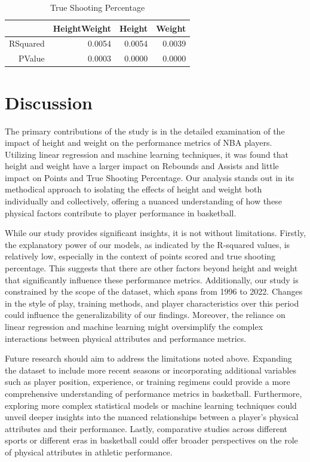 \documentclass[12pt]{article}
\begin{document}
\begin{table}[ht]
\caption{True Shooting Percentage}
\label{tab:ts}
\centering
\begin{tabular}{rrrr}
  \hline
 & HeightWeight & Height & Weight \\ 
  \hline
RSquared & 0.0054 & 0.0054 & 0.0039 \\ 
  PValue & 0.0003 & 0.0000 & 0.0000 \\ 
   \hline
\end{tabular}
\end{table}



\section{Discussion}
\label{sec:disc}

The primary contributions of the study is in the detailed examination of the impact of height and weight on the performance 
metrics of NBA players. Utilizing linear regression and machine learning techniques, it was found that height and weight
have a larger impact on Rebounds and Assists and little impact on Points and True Shooting Percentage. Our analysis stands 
out in its methodical approach to isolating the effects of height and weight both individually and collectively, offering a nuanced 
understanding of how these physical factors contribute to player performance in basketball. 

While our study provides significant insights, it is not without limitations. Firstly, the explanatory power of our models, as 
indicated by the R-squared values, is relatively low, especially in the context of points scored and true shooting percentage. This 
suggests that there are other factors beyond height and weight that significantly influence these performance metrics. Additionally, 
our study is constrained by the scope of the dataset, which spans from 1996 to 2022. Changes in the style of play, training 
methods, and player characteristics over this period could influence the generalizability of our findings. Moreover, the reliance 
on linear regression and machine learning might oversimplify the complex interactions between physical attributes and performance 
metrics.

Future research should aim to address the limitations noted above. Expanding the dataset to include more recent seasons or 
incorporating additional variables such as player position, experience, or training regimens could provide a more comprehensive 
understanding of performance metrics in basketball. Furthermore, exploring more complex statistical models or machine learning 
techniques could unveil deeper insights into the nuanced relationships between a player's physical attributes and their performance. 
Lastly, comparative studies across different sports or different eras in basketball could offer broader perspectives on the role of 
physical attributes in athletic performance.



\end{document}
